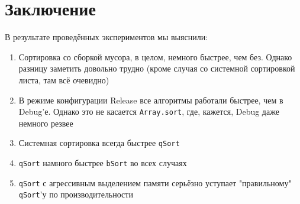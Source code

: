 \section{Заключение}

В результате проведённых экспериментов мы выяснили:
\begin{enumerate}
  \item Сортировка со сборкой мусора, в целом, немного быстрее, чем без. Однако разницу заметить довольно трудно (кроме случая со системной сортировкой листа, там всё очевидно)
  \item В режиме конфигурации Release все алгоритмы работали быстрее, чем в Debug'е. Однако это не касается \verb|Array.sort|, где, кажется, Debug даже немного резвее
  \item Системная сортировка всегда быстрее \verb|qSort|
  \item \verb|qSort| намного быстрее \verb|bSort| во всех случаях
  \item \verb|qSort| с агрессивным выделением памяти серьёзно уступает "правильному" \verb|qSort|'у по производительности
\end{enumerate}
